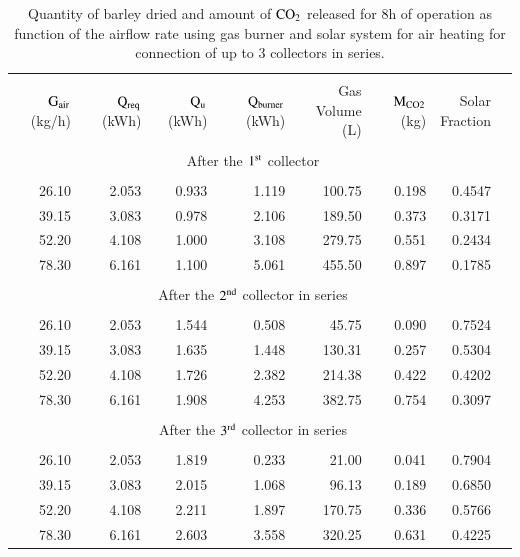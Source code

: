 \begin{table}[h]
	\caption{Quantity of barley dried and amount of $\rm{CO_2}$ released for 8h of operation as function of the airflow rate using gas burner and solar system for air heating for connection of up to 3 collectors in series.}
	\centering
	
	\begin{tabular}{rrrrrrrr}
		\hline \\ [-10pt]
		 \makecell{$\rm{G_{air}}$ \\ (kg/h)} & \makecell{$\rm{Q_{req}}$ \\ (kWh)} & 	\makecell{$\rm{Q_{u}}$ \\ (kWh)} & 	\makecell{$\rm{Q_{burner}}$  \\ (kWh)} & \makecell{Gas Volume \\ (L)} & \makecell{$\rm{M_{CO2}}$  \\ (kg)} & \makecell{Solar \\ Fraction} \\
		\hline \\ [-10pt]
		\multicolumn{7}{c}{After the $\rm{1^{st}}$ collector} \\ \hline \\ [-10pt]
		26.10 & 2.053 & 0.933 & 1.119 & 100.75 & 0.198 & 0.4547 \\ [2pt]
		39.15 & 3.083 & 0.978 & 2.106 & 189.50 & 0.373 & 0.3171 \\ [2pt]
		52.20 & 4.108 & 1.000 & 3.108 & 279.75 & 0.551 & 0.2434 \\ [2pt]
		78.30 & 6.161 & 1.100 & 5.061 & 455.50 & 0.897 & 0.1785 \\
		\hline \\ [-10pt]
		\multicolumn{7}{c}{After the $\rm{2^{nd}}$ collector in series} \\ \hline \\ [-10pt]
		26.10 & 2.053 & 1.544 & 0.508 & 45.75 & 0.090 & 0.7524 \\ [2pt]
		39.15 & 3.083 & 1.635 & 1.448 & 130.31 & 0.257 & 0.5304 \\ [2pt]
		52.20 & 4.108 & 1.726 & 2.382 & 214.38 & 0.422 & 0.4202 \\ [2pt]
		78.30 & 6.161 & 1.908 & 4.253 & 382.75 & 0.754 & 0.3097 \\ 
		\hline \\ [-10pt]
		\multicolumn{7}{c}{After the $\rm{3^{rd}}$ collector in series} \\ \hline \\ [-10pt]
		26.10 & 2.053 & 1.819 & 0.233 & 21.00 & 0.041 & 0.7904 \\ [2pt]
		39.15 & 3.083 & 2.015 & 1.068 & 96.13 & 0.189 & 0.6850 \\ [2pt]
		52.20 & 4.108 & 2.211 & 1.897 & 170.75 & 0.336 & 0.5766 \\ [2pt]
		78.30 & 6.161 & 2.603 & 3.558 & 320.25 & 0.631 & 0.4225 \\
		\hline
	\end{tabular}
	
	\label{gas-solar}
\end{table}

